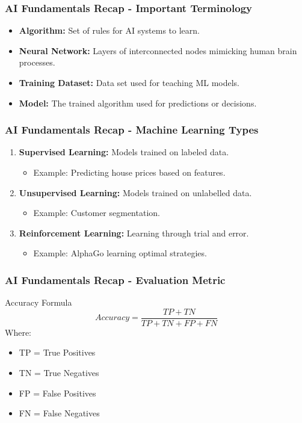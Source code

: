 \documentclass{beamer}
\begin{document}
\begin{frame}[fragile]
    \frametitle{AI Fundamentals Recap - Important Terminology}
    \begin{itemize}
        \item \textbf{Algorithm:} Set of rules for AI systems to learn.
        \item \textbf{Neural Network:} Layers of interconnected nodes mimicking human brain processes.
        \item \textbf{Training Dataset:} Data set used for teaching ML models.
        \item \textbf{Model:} The trained algorithm used for predictions or decisions.
    \end{itemize}
\end{frame}

\begin{frame}[fragile]
    \frametitle{AI Fundamentals Recap - Machine Learning Types}
    \begin{enumerate}
        \item \textbf{Supervised Learning:} Models trained on labeled data.
            \begin{itemize}
                \item Example: Predicting house prices based on features.
            \end{itemize}
        \item \textbf{Unsupervised Learning:} Models trained on unlabelled data.
            \begin{itemize}
                \item Example: Customer segmentation.
            \end{itemize}
        \item \textbf{Reinforcement Learning:} Learning through trial and error.
            \begin{itemize}
                \item Example: AlphaGo learning optimal strategies.
            \end{itemize}
    \end{enumerate}
\end{frame}

\begin{frame}[fragile]
    \frametitle{AI Fundamentals Recap - Evaluation Metric}
    \begin{block}{Accuracy Formula}
        \[
        Accuracy = \frac{TP + TN}{TP + TN + FP + FN}
        \]
        Where:
        \begin{itemize}
            \item TP = True Positives
            \item TN = True Negatives
            \item FP = False Positives
            \item FN = False Negatives
        \end{itemize}
    \end{block}
\end{frame}
\end{document}
